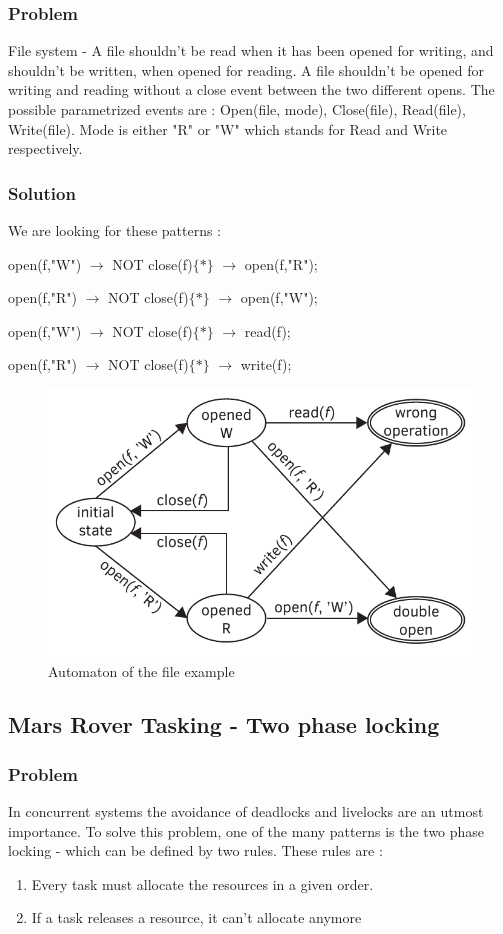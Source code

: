 			\subsubsection{Problem}
				File system - A file shouldn't be read when it has been opened for writing, and shouldn't be written, when opened for reading. 
				A file shouldn't be opened for writing and reading without a close event between the two different opens.
				The possible parametrized events are : 
				Open(file, mode), 
				Close(file), 
				Read(file), 
				Write(file). 
				Mode is either "R" or "W" which stands for Read and Write respectively.
			\subsubsection{Solution}
				We are looking for these patterns : 
				
				open(f,"W") $\rightarrow$ NOT close(f)$\{\ast\}$ $\rightarrow$ open(f,"R");
				
				open(f,"R") $\rightarrow$ NOT close(f)$\{\ast\}$ $\rightarrow$ open(f,"W");
				
				open(f,"W") $\rightarrow$ NOT close(f)$\{\ast\}$ $\rightarrow$ read(f);
				
				open(f,"R") $\rightarrow$ NOT close(f)$\{\ast\}$ $\rightarrow$ write(f);
				
				\begin{figure}[h]
				\centering
				\includegraphics[width=0.7\linewidth]{include/figures/chapter_5/file_example_aut}
				\caption{Automaton of the file example}
				\label{fig:cep:fileautomaton}
				\end{figure}

		
		
		\subsection{Mars Rover Tasking - Two phase locking}
			\subsubsection{Problem}
				In concurrent systems the avoidance of deadlocks and livelocks are an utmost importance.
				To solve this problem, one of the many patterns is  the two phase locking - which can be defined by two rules.
				These rules are : 
				\begin{enumerate}
					\item{Every task must allocate the resources in a given order.}
					\item{If a task releases a resource, it can't allocate anymore}
				\end{enumerate}
